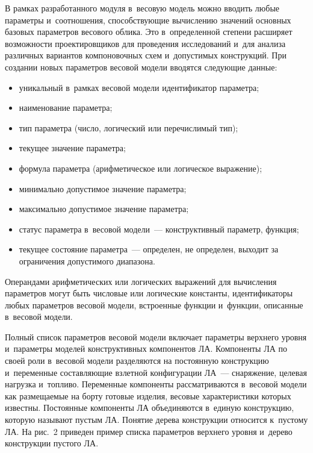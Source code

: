 \begin{multicols}{2}
  В рамках разработанного модуля в~весовую модель можно вводить любые 
параметры и~соотношения, способствующие вычислению значений основных 
базовых параметров весового облика. Это в~определенной степени расширяет 
возможности проектировщиков для проведения исследований и~для анализа 
различных вариантов компоновочных схем и~допустимых конструкций. При 
создании новых параметров весовой модели вводятся следующие данные:
  \begin{itemize}
  \item уникальный в~рамках весовой модели идентификатор параметра;
  \item наименование параметра;
  \item тип параметра (число, логический или пере\-чис\-ли\-мый тип);
  \item текущее значение параметра;
  \item формула параметра (арифметическое или логическое выражение);
  \item минимально допустимое значение параметра;
  \item максимально допустимое значение параметра;
  \item  статус параметра в~весовой модели~--- конструктивный параметр, 
функция;
  \item текущее состояние параметра~--- определен, не определен, выходит за 
ограничения допустимого диапазона. 
  \end{itemize}
  
  Операндами арифметических или логических выражений для вычисления 
параметров могут быть числовые или логические константы, идентификаторы 
любых параметров весовой модели, встроенные функции и~функции, 
описанные в~весовой модели.
  
  Полный список параметров весовой модели включает параметры верхнего 
уровня и~па\-ра\-мет\-ры моделей конструктивных компонентов ЛА. Компоненты 
ЛА по своей роли в~весовой модели разделяют\-ся на постоянную конструкцию 
и~переменные составляющие взлетной конфигурации ЛА~--- снаряжение, 
целевая нагрузка и~топливо. Переменные компоненты рассматриваются 
в~весовой модели как размещаемые на борту готовые изделия, весовые 
характеристики которых известны. Постоянные компоненты ЛА объединяются 
в~единую конструкцию, которую называют пустым ЛА. Понятие дерева 
конструкции относится к~пустому ЛА. На рис.~2 приведен пример списка 
параметров верхнего уровня и~дерево конструкции пустого ЛА.
  
\begin{figure*} %
\vspace*{1pt}
  \begin{center}  
    \mbox{%
\epsfxsize=163mm
}


\end{center}
\end{figure*}
\end{multicols}
